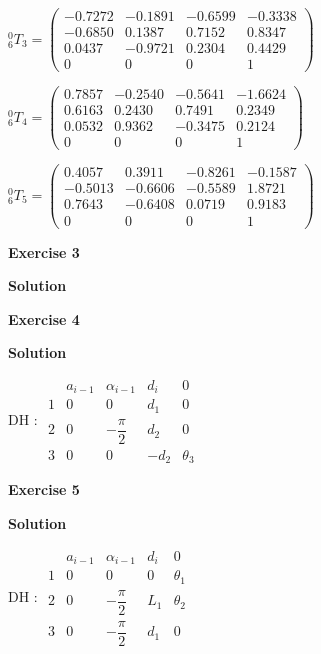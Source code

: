 \documentclass[8pt]{article}
\begin{document}
\begin{list}{()~}{}
$^0_6T_3 = \left( \begin{array}{cccc}
-0.7272 & -0.1891 &  -0.6599 & -0.3338 \\
-0.6850 & 0.1387 & 0.7152 & 0.8347 \\
0.0437 & -0.9721 & 0.2304 & 0.4429 \\
0 & 0 & 0 & 1
\end{array} \right) $

$^0_6T_4 = \left( \begin{array}{cccc}
0.7857  & -0.2540  & -0.5641 &  -1.6624 \\
0.6163  &  0.2430  &  0.7491 &  0.2349 \\
0.0532  &  0.9362  &  -0.3475&  0.2124 \\
0 & 0 & 0 & 1
\end{array} \right) $
    
$^0_6T_5 = \left( \begin{array}{cccc}
  0.4057  &  0.3911 &  -0.8261 &  -0.1587 \\
 -0.5013  & -0.6606 &  -0.5589 &  1.8721 \\
 0.7643   & -0.6408 &  0.0719  & 0.9183 \\
0 & 0 & 0 & 1
\end{array} \right) $

\newpage

\textbf{Exercise 3}		
		
\textbf{Solution}



\newpage

\textbf{Exercise 4}		
		
\textbf{Solution}

DH :
$ \begin{array}{ccccc}
& a_{i-1} & \alpha_{i-1} & d_i & 0\\
1 & 0 & 0 & d_1 & 0 \\
2 & 0 & -\dfrac{\pi}{2} & d_2 & 0 \\
3 & 0 & 0 & -d_2 & \theta_3
\end{array} $

\textbf{Exercise 5}		
		
\textbf{Solution}

DH :
$ \begin{array}{ccccc}
& a_{i-1} & \alpha_{i-1} & d_i & 0\\
1 & 0 & 0 & 0 & \theta_1 \\
2 & 0 & -\dfrac{\pi}{2} & L_1 & \theta_2 \\
3 & 0 & -\dfrac{\pi}{2} & d_1 & 0
\end{array} $

\medskip

\end{list}
\end{document}
